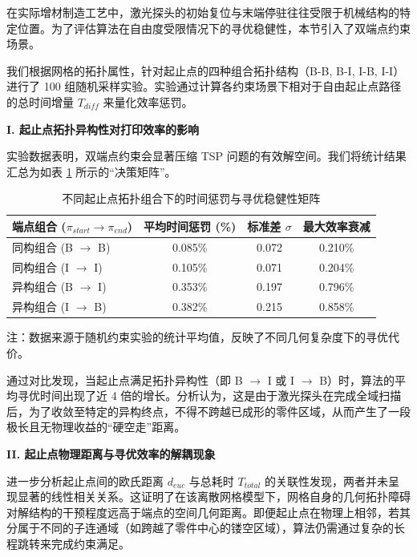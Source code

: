\documentclass[a4paper, 12pt]{ctexart}
\begin{document}
在实际增材制造工艺中，激光探头的初始复位与末端停驻往往受限于机械结构的特定位置。为了评估算法在自由度受限情况下的寻优稳健性，本节引入了双端点约束场景。

我们根据网格的拓扑属性，针对起止点的四种组合拓扑结构（B-B, B-I, I-B, I-I）进行了 100 组随机采样实验。实验通过计算各约束场景下相对于自由起止点路径的总时间增量 $T_{diff}$ 来量化效率惩罚。

\vspace{0.5em}
\noindent\textbf{I. 起止点拓扑异构性对打印效率的影响}
\vspace{0.5em}

实验数据表明，双端点约束会显著压缩 TSP 问题的有效解空间。我们将统计结果汇总为如表 \ref{tab:fixed_end_summary} 所示的“决策矩阵”。

\begin{table}[H]
    \centering
    \caption{不同起止点拓扑组合下的时间惩罚与寻优稳健性矩阵}
    \label{tab:fixed_end_summary}
    \begin{tabular}{@{}lccc@{}}
        \toprule
        \textbf{端点组合 ($\pi_{start} \to \pi_{end}$)} & \textbf{平均时间惩罚 (\%) } & \textbf{标准差 $\sigma$ } & \textbf{最大效率衰减} \\ \midrule
        同构组合 (B $\to$ B) & 0.085\% & 0.072 & 0.210\% \\
        同构组合 (I $\to$ I) & 0.105\% & 0.071 & 0.204\% \\
        异构组合 (B $\to$ I) & 0.353\% & 0.197 & 0.796\% \\
        异构组合 (I $\to$ B) & 0.382\% & 0.215 & 0.858\% \\ \bottomrule
    \end{tabular}
    \par \small 注：数据来源于随机约束实验的统计平均值，反映了不同几何复杂度下的寻优代价。
\end{table}

通过对比发现，当起止点满足拓扑异构性（即 B $\to$ I 或 I $\to$ B）时，算法的平均寻优时间出现了近 4 倍的增长。分析认为，这是由于激光探头在完成全域扫描后，为了收敛至特定的异构终点，不得不跨越已成形的零件区域，从而产生了一段极长且无物理收益的“硬空走”距离。

\vspace{0.5em}
\noindent\textbf{II. 起止点物理距离与寻优效率的解耦现象}
\vspace{0.5em}

进一步分析起止点间的欧氏距离 $d_{euc}$ 与总耗时 $T_{total}$ 的关联性发现，两者并未呈现显著的线性相关关系。这证明了在该离散网格模型下，网格自身的几何拓扑障碍对解结构的干预程度远高于端点的空间几何距离。即便起止点在物理上相邻，若其分属于不同的子连通域（如跨越了零件中心的镂空区域），算法仍需通过复杂的长程跳转来完成约束满足。
\end{document}
